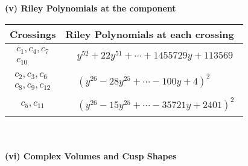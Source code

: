 \documentclass[1p]{elsarticle_modified}
\theoremstyle{definition}
\begin{document}
\newpage\renewcommand{\arraystretch}{1}
\flushleft \textbf{(v) Riley Polynomials at the component}\newline \\
\begin{tabular}{m{50pt}|m{274pt}}
Crossings & \hspace{64pt}Riley Polynomials at each crossing \\
\hline $$\begin{aligned}c_{1},c_{4},c_{7}\\c_{10}\end{aligned}$$&$\begin{aligned}
&y^{52}+22 y^{51}+\cdots+1455729 y+113569
\end{aligned}$\\
\hline $$\begin{aligned}c_{2},c_{3},c_{6}\\c_{8},c_{9},c_{12}\end{aligned}$$&$\begin{aligned}
&(y^{26}-28 y^{25}+\cdots-100 y+4)^{2}
\end{aligned}$\\
\hline $$\begin{aligned}c_{5},c_{11}\end{aligned}$$&$\begin{aligned}
&(y^{26}-15 y^{25}+\cdots-35721 y+2401)^{2}
\end{aligned}$\\
\hline
\end{tabular}\\~\\
\newpage\flushleft \textbf{(vi) Complex Volumes and Cusp Shapes}
\end{document}
